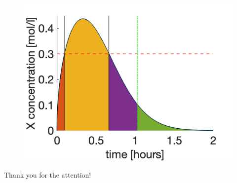 \documentclass[xcolor={dvipsnames,rgb}, aspectratio=169]{beamer}
\begin{document}
\begin{frame}{}
   \begin{figure}
      \centering
      \includegraphics[width=.7\textwidth]{Solution.png}
   \end{figure}
\end{frame}


{%
\begin{frame}[standout]
	Thank you for the attention!
\end{frame}
}
\end{document}
